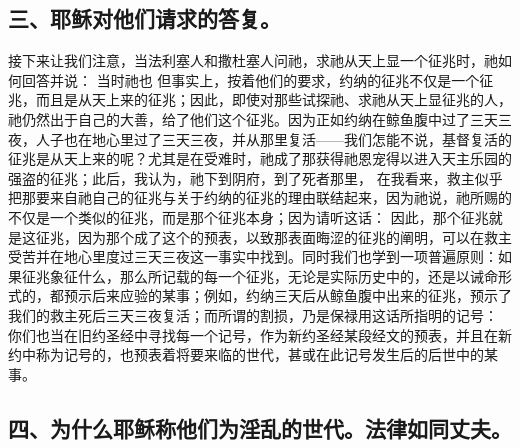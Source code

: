 
\subsection{三、耶稣对他们请求的答复。}

接下来让我们注意，当法利塞人和撒杜塞人问祂，求祂从天上显一个征兆时，祂如何回答并说： 当时祂也 但事实上，按着他们的要求，约纳的征兆不仅是一个征兆，而且是从天上来的征兆；因此，即使对那些试探祂、求祂从天上显征兆的人，祂仍然出于自己的大善，给了他们这个征兆。因为正如约纳在鲸鱼腹中过了三天三夜，人子也在地心里过了三天三夜，并从那里复活——我们怎能不说，基督复活的征兆是从天上来的呢？尤其是在受难时，祂成了那获得祂恩宠得以进入天主乐园的强盗的征兆；此后，我认为，祂下到阴府，到了死者那里， 在我看来，救主似乎把那要来自祂自己的征兆与关于约纳的征兆的理由联结起来，因为祂说，祂所赐的不仅是一个类似的征兆，而是那个征兆本身；因为请听这话： 因此，那个征兆就是这征兆，因为那个成了这个的预表，以致那表面晦涩的征兆的阐明，可以在救主受苦并在地心里度过三天三夜这一事实中找到。同时我们也学到一项普遍原则：如果征兆象征什么，那么所记载的每一个征兆，无论是实际历史中的，还是以诫命形式的，都预示后来应验的某事；例如，约纳三天后从鲸鱼腹中出来的征兆，预示了我们的救主死后三天三夜复活；而所谓的割损，乃是保禄用这话所指明的记号： 你们也当在旧约圣经中寻找每一个记号，作为新约圣经某段经文的预表，并且在新约中称为记号的，也预表着将要来临的世代，甚或在此记号发生后的后世中的某事。\par


\subsection{四、为什么耶稣称他们为淫乱的世代。法律如同丈夫。}

